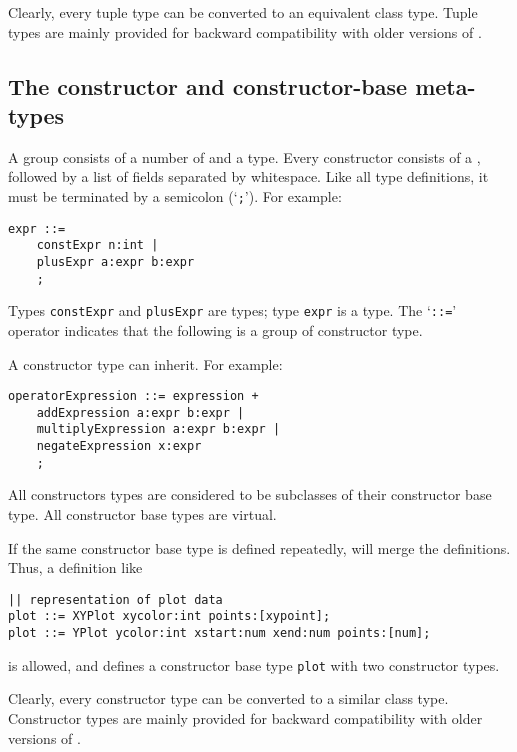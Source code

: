 Clearly, every tuple type can be converted to an equivalent class type.
Tuple types are mainly provided for backward compatibility with
older versions of {\Tm}.
\subsection{The constructor and constructor-base meta-types}
A  group consists of a number of 
and a  type.
Every constructor consists of a , followed by a 
list of fields separated by whitespace.
Like all type definitions, it must be terminated by a semicolon (`\verb';'').
For example:
\begin{showfile}
\begin{verbatim}
expr ::=
    constExpr n:int |
    plusExpr a:expr b:expr
    ;
\end{verbatim}
\end{showfile}
Types \texttt{constExpr} and \texttt{plusExpr} are  types;
type \texttt{expr} is a  type.
The `\verb'::='' operator indicates that the following is a group of
constructor type.

A constructor type can inherit. For example:
\begin{showfile}
\begin{verbatim}
operatorExpression ::= expression +
    addExpression a:expr b:expr |
    multiplyExpression a:expr b:expr |
    negateExpression x:expr
    ;
\end{verbatim}
\end{showfile}
All constructors types are considered to be subclasses of their
constructor base type. All constructor base types are virtual.

If the same constructor base type is defined repeatedly, {\Tm} will merge the
definitions.
Thus, a definition like
\begin{showfile}
\begin{verbatim}
|| representation of plot data
plot ::= XYPlot xycolor:int points:[xypoint];
plot ::= YPlot ycolor:int xstart:num xend:num points:[num];
\end{verbatim}
\end{showfile}
is allowed, and defines a constructor base type \texttt{plot} with two
constructor types.

Clearly, every constructor type can be converted to a similar class type.
Constructor types are mainly provided for backward compatibility with
older versions of {\Tm}.
